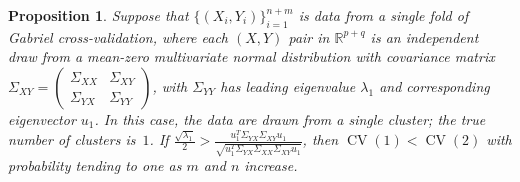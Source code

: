 \documentclass[12pt]{article}
\newtheorem{proposition}{Proposition}
\newcommand{\CV}{\operatorname{CV}}
\newcommand{\R}{\mathbb{R}}
\begin{document}
\begin{proposition}
Suppose that $\{ (X_i, Y_i) \}_{i=1}^{n + m}$ is data from a single fold
of Gabriel cross-validation, where each $(X,Y)$ pair in $\R^{p+q}$ is an
independent draw from a mean-zero multivariate normal distribution with 
covariance matrix $\Sigma_{XY}= \left( \begin{smallmatrix} \Sigma_{XX} & \Sigma_{XY} \\ 
 \Sigma_{YX} & \Sigma_{YY} \end{smallmatrix}\right)$, with $\Sigma_{YY}$ has leading 
eigenvalue $\lambda_1$ and corresponding eigenvector $u_1$. In this case, the data are drawn
from a single cluster; the true number of clusters is~$1$.  If  $\frac{\sqrt{\lambda_1}}{2}
 > \frac{u^T_1\Sigma_{YX}\Sigma_{XY}u_1}{\sqrt{u^T_1\Sigma_{YX} \Sigma_{XX} \Sigma_{XY} u_1}}$,
then $\CV(1) < \CV(2)$ with probability tending to one as $m$ and $n$ increase.
\end{proposition}
\end{document}
